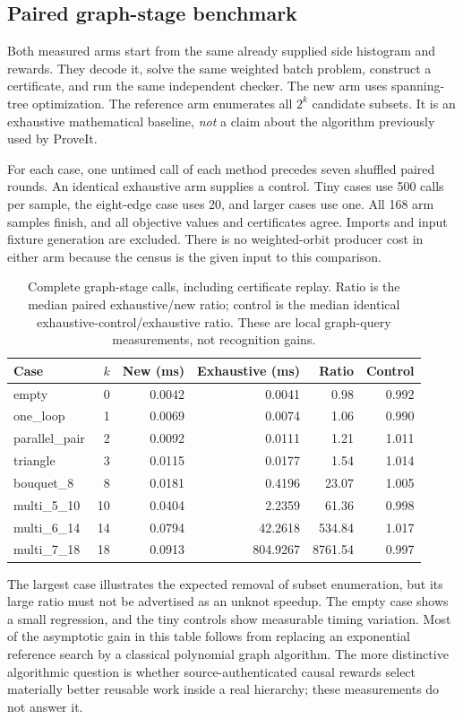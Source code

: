 \documentclass[11pt]{article}
\theoremstyle{definition}
\begin{document}
\subsection{Paired graph-stage benchmark}
Both measured arms start from the same already supplied side histogram and rewards. They decode it, solve the same weighted batch problem, construct a certificate, and run the same independent checker. The new arm uses spanning-tree optimization. The reference arm enumerates all $2^k$ candidate subsets. It is an exhaustive mathematical baseline, \emph{not} a claim about the algorithm previously used by ProveIt.

For each case, one untimed call of each method precedes seven shuffled paired rounds. An identical exhaustive arm supplies a control. Tiny cases use 500 calls per sample, the eight-edge case uses 20, and larger cases use one. All 168 arm samples finish, and all objective values and certificates agree. Imports and input fixture generation are excluded. There is no weighted-orbit producer cost in either arm because the census is the given input to this comparison.

\begin{table}[ht]
\centering\small
\begin{tabular}{lrrrrr}
\toprule
Case & $k$ & New (ms) & Exhaustive (ms) & Ratio & Control \\
\midrule
empty & 0 & 0.0042 & 0.0041 & 0.98 & 0.992 \\
one\_loop & 1 & 0.0069 & 0.0074 & 1.06 & 0.990 \\
parallel\_pair & 2 & 0.0092 & 0.0111 & 1.21 & 1.011 \\
triangle & 3 & 0.0115 & 0.0177 & 1.54 & 1.014 \\
bouquet\_8 & 8 & 0.0181 & 0.4196 & 23.07 & 1.005 \\
multi\_5\_10 & 10 & 0.0404 & 2.2359 & 61.36 & 0.998 \\
multi\_6\_14 & 14 & 0.0794 & 42.2618 & 534.84 & 1.017 \\
multi\_7\_18 & 18 & 0.0913 & 804.9267 & 8761.54 & 0.997 \\
\bottomrule
\end{tabular}
\caption{Complete graph-stage calls, including certificate replay. Ratio is the median paired exhaustive/new ratio; control is the median identical exhaustive-control/exhaustive ratio. These are local graph-query measurements, not recognition gains.}\label{tab:benchmark}
\end{table}

The largest case illustrates the expected removal of subset enumeration, but its large ratio must not be advertised as an unknot speedup. The empty case shows a small regression, and the tiny controls show measurable timing variation. Most of the asymptotic gain in this table follows from replacing an exponential reference search by a classical polynomial graph algorithm. The more distinctive algorithmic question is whether source-authenticated causal rewards select materially better reusable work inside a real hierarchy; these measurements do not answer it.
\end{document}
